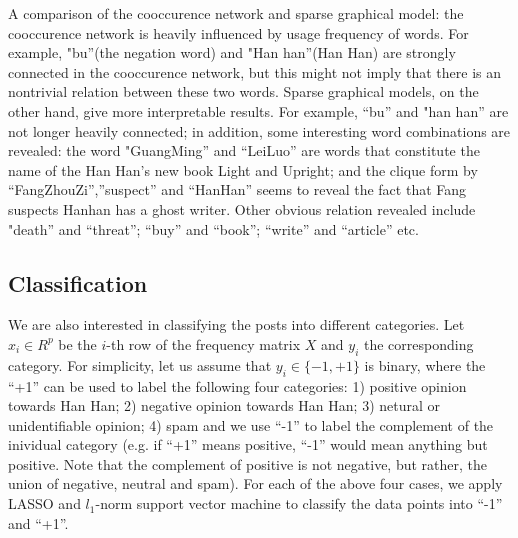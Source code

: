\documentclass[11pt]{article}
\newcommand{\1}[1]{{\mathbf 1}\left\{#1\right\}}        %
\begin{document}
A comparison of the cooccurence network and sparse graphical model: the cooccurence network is heavily influenced by usage frequency of words. For example, "bu''(the negation word) and "Han han''(Han Han) are strongly connected in the cooccurence network, but this might not imply that there is an nontrivial relation between these two words. Sparse graphical models, on the other hand, give more interpretable results. For example, ``bu'' and "han han'' are not longer heavily connected; in addition, some interesting word combinations are revealed: the word "GuangMing'' and ``LeiLuo'' are words that constitute the name of the Han Han's new book Light and Upright; and the clique form by ``FangZhouZi'',''suspect'' and  ``HanHan'' seems to reveal the fact that Fang suspects Hanhan has a ghost writer. Other obvious relation revealed include "death'' and ``threat''; ``buy'' and ``book''; ``write'' and ``article'' etc.

\subsection{Classification}
We are also interested in classifying the posts into different categories. Let $x_i\in R^{p}$ be the $i$-th row of the frequency matrix $X$ and $y_i$ the corresponding category. For simplicity, let us assume that $y_i\in\{-1,+1\}$ is binary, where the ``+1'' can be used to label the following four categories: 1) positive opinion towards Han Han; 2) negative opinion towards Han Han; 3) netural or unidentifiable opinion; 4) spam and we use ``-1'' to label the complement of the inividual category (e.g. if ``+1'' means positive, ``-1'' would mean anything but positive. Note that the complement of positive is not negative, but rather, the union of negative, neutral and spam). For each of the above four cases, we apply LASSO and $l_1$-norm support vector machine to classify the data points into ``-1'' and ``+1''.  
  
\end{document}
